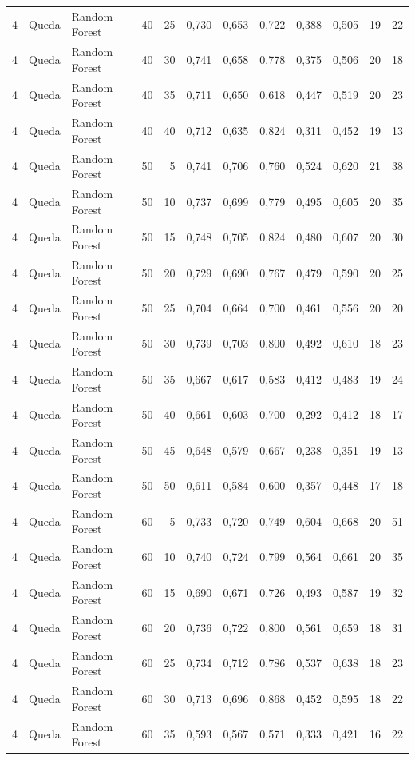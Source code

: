 \begin{longtable}{@{}rllrrrrrrrrr@{}}
4 & Queda & Random Forest & 40 & 25 & 0,730 & 0,653 & 0,722 & 0,388 & 0,505 & 19 & 22 \\
4 & Queda & Random Forest & 40 & 30 & 0,741 & 0,658 & 0,778 & 0,375 & 0,506 & 20 & 18 \\
4 & Queda & Random Forest & 40 & 35 & 0,711 & 0,650 & 0,618 & 0,447 & 0,519 & 20 & 23 \\
4 & Queda & Random Forest & 40 & 40 & 0,712 & 0,635 & 0,824 & 0,311 & 0,452 & 19 & 13 \\
4 & Queda & Random Forest & 50 & 5 & 0,741 & 0,706 & 0,760 & 0,524 & 0,620 & 21 & 38 \\
4 & Queda & Random Forest & 50 & 10 & 0,737 & 0,699 & 0,779 & 0,495 & 0,605 & 20 & 35 \\
4 & Queda & Random Forest & 50 & 15 & 0,748 & 0,705 & 0,824 & 0,480 & 0,607 & 20 & 30 \\
4 & Queda & Random Forest & 50 & 20 & 0,729 & 0,690 & 0,767 & 0,479 & 0,590 & 20 & 25 \\
4 & Queda & Random Forest & 50 & 25 & 0,704 & 0,664 & 0,700 & 0,461 & 0,556 & 20 & 20 \\
4 & Queda & Random Forest & 50 & 30 & 0,739 & 0,703 & 0,800 & 0,492 & 0,610 & 18 & 23 \\
4 & Queda & Random Forest & 50 & 35 & 0,667 & 0,617 & 0,583 & 0,412 & 0,483 & 19 & 24 \\
4 & Queda & Random Forest & 50 & 40 & 0,661 & 0,603 & 0,700 & 0,292 & 0,412 & 18 & 17 \\
4 & Queda & Random Forest & 50 & 45 & 0,648 & 0,579 & 0,667 & 0,238 & 0,351 & 19 & 13 \\
4 & Queda & Random Forest & 50 & 50 & 0,611 & 0,584 & 0,600 & 0,357 & 0,448 & 17 & 18 \\
4 & Queda & Random Forest & 60 & 5 & 0,733 & 0,720 & 0,749 & 0,604 & 0,668 & 20 & 51 \\
4 & Queda & Random Forest & 60 & 10 & 0,740 & 0,724 & 0,799 & 0,564 & 0,661 & 20 & 35 \\
4 & Queda & Random Forest & 60 & 15 & 0,690 & 0,671 & 0,726 & 0,493 & 0,587 & 19 & 32 \\
4 & Queda & Random Forest & 60 & 20 & 0,736 & 0,722 & 0,800 & 0,561 & 0,659 & 18 & 31 \\
4 & Queda & Random Forest & 60 & 25 & 0,734 & 0,712 & 0,786 & 0,537 & 0,638 & 18 & 23 \\
4 & Queda & Random Forest & 60 & 30 & 0,713 & 0,696 & 0,868 & 0,452 & 0,595 & 18 & 22 \\
4 & Queda & Random Forest & 60 & 35 & 0,593 & 0,567 & 0,571 & 0,333 & 0,421 & 16 & 22 \\

\end{longtable}
